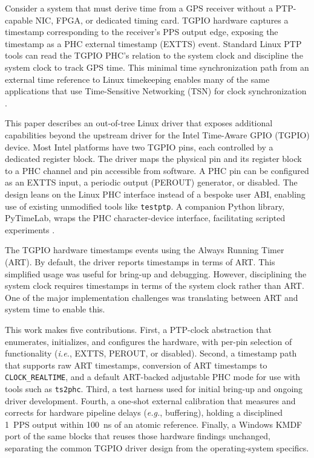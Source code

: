 \documentclass[conference,a4paper]{IEEEtran}
\newcommand{\ie}{\textit{i.e.},\xspace}
\newcommand{\eg}{\textit{e.g.},\xspace}
\newcommand{\PyLib}{PyTimeLab\xspace}
\newcommand{\ClRT}{\texttt{CLOCK\_REALTIME}\xspace}
\newcommand{\tsphc}{\texttt{ts2phc}\xspace}
\begin{document}
Consider a system that must derive time from a GPS receiver without a PTP-capable NIC, FPGA, or dedicated timing card. TGPIO hardware captures a timestamp corresponding to the receiver's PPS output edge, exposing the timestamp as a PHC external timestamp (EXTTS) event. Standard Linux PTP tools can read the TGPIO PHC's relation to the system clock and discipline the system clock to track GPS time. This minimal time synchronization path from an external time reference to Linux timekeeping enables many of the same applications that use Time-Sensitive Networking (TSN) for clock synchronization \cite{ieee8021as}.


This paper describes an out-of-tree Linux driver that exposes additional capabilities beyond the upstream driver for the Intel Time-Aware GPIO (TGPIO) device. Most Intel platforms have two TGPIO pins, each controlled by a dedicated register block. The driver maps the physical pin and its register block to a PHC channel and pin accessible from software. A PHC pin can be configured as an EXTTS input, a periodic output (PEROUT) generator, or disabled. The design leans on the Linux PHC interface instead of a bespoke user ABI, enabling use of existing unmodified tools like \texttt{testptp}. A companion Python library, \PyLib, wraps the PHC character-device interface, facilitating scripted experiments \cite{pyptm-repo}.

The TGPIO hardware timestamps events using the Always Running Timer (ART). By default, the driver reports timestamps in terms of ART. This simplified usage was useful for bring-up and debugging. However, disciplining the system clock requires timestamps in terms of the system clock rather than ART. One of the major implementation challenges was translating between ART and system time to enable this.

This work makes five contributions. First, a PTP-clock abstraction that enumerates, initializes, and configures the hardware, with per-pin selection of functionality (\ie EXTTS, PEROUT, or disabled). Second, a timestamp path that supports raw ART timestamps, conversion of ART timestamps to \ClRT, and a default ART-backed adjustable PHC mode for use with tools such as \tsphc. Third, a test harness used for initial bring-up and ongoing driver development. Fourth, a one-shot external calibration that measures and corrects for hardware pipeline delays (\eg buffering), holding a disciplined 1~PPS output within 100~ns of an atomic reference. Finally, a Windows KMDF port of the same blocks that reuses those hardware findings unchanged, separating the common TGPIO driver design from the operating-system specifics.
\end{document}
